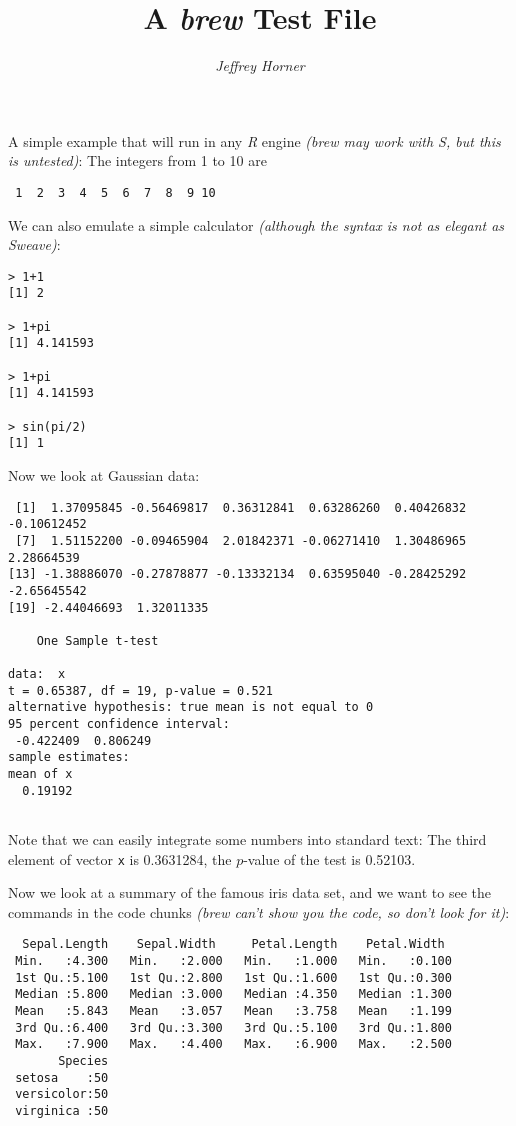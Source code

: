 \documentclass[a4paper]{article}
\title{A \emph{brew} Test File}
\author{\emph{Jeffrey Horner}}
\begin{document}
\maketitle

A simple example that will run in any \emph{R} engine \emph{(brew may work with S, but this is untested)}: The integers from 1 to
10 are
\begin{verbatim}
 1  2  3  4  5  6  7  8  9 10
\end{verbatim}

We can also emulate a simple calculator \emph{(although the syntax is not as elegant as Sweave)}:
\begin{verbatim}
> 1+1
[1] 2

> 1+pi
[1] 4.141593

> 1+pi
[1] 4.141593

> sin(pi/2)
[1] 1

\end{verbatim}

Now we look at Gaussian data:

\begin{verbatim}
 [1]  1.37095845 -0.56469817  0.36312841  0.63286260  0.40426832 -0.10612452
 [7]  1.51152200 -0.09465904  2.01842371 -0.06271410  1.30486965  2.28664539
[13] -1.38886070 -0.27878877 -0.13332134  0.63595040 -0.28425292 -2.65645542
[19] -2.44046693  1.32011335

	One Sample t-test

data:  x
t = 0.65387, df = 19, p-value = 0.521
alternative hypothesis: true mean is not equal to 0
95 percent confidence interval:
 -0.422409  0.806249
sample estimates:
mean of x 
  0.19192 


\end{verbatim}

Note that we can easily integrate some numbers into standard text: The
third element of vector \texttt{x} is 0.3631284, the
$p$-value of the test is 0.52103. %

Now we look at a summary of the famous iris data set, and we want to
see the commands in the code chunks \emph{(brew can't show you the code, so
don't look for it)}:

\begin{verbatim}
  Sepal.Length    Sepal.Width     Petal.Length    Petal.Width   
 Min.   :4.300   Min.   :2.000   Min.   :1.000   Min.   :0.100  
 1st Qu.:5.100   1st Qu.:2.800   1st Qu.:1.600   1st Qu.:0.300  
 Median :5.800   Median :3.000   Median :4.350   Median :1.300  
 Mean   :5.843   Mean   :3.057   Mean   :3.758   Mean   :1.199  
 3rd Qu.:6.400   3rd Qu.:3.300   3rd Qu.:5.100   3rd Qu.:1.800  
 Max.   :7.900   Max.   :4.400   Max.   :6.900   Max.   :2.500  
       Species  
 setosa    :50  
 versicolor:50  
 virginica :50  
                
                
                

\end{verbatim}
\end{document}
